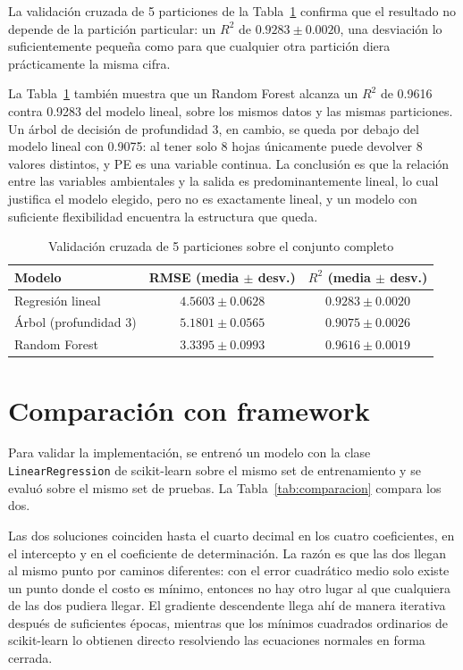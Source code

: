 \documentclass[conference]{IEEEtran}
\begin{document}
La validación cruzada de 5 particiones de la Tabla~\ref{tab:cv} confirma que el resultado no depende de la partición particular: un $R^2$ de $0.9283 \pm 0.0020$, una desviación lo suficientemente pequeña como para que cualquier otra partición diera prácticamente la misma cifra.

La Tabla~\ref{tab:cv} también muestra que un Random Forest alcanza un $R^2$ de 0.9616 contra 0.9283 del modelo lineal, sobre los mismos datos y las mismas particiones. Un árbol de decisión de profundidad 3, en cambio, se queda por debajo del modelo lineal con 0.9075: al tener solo 8 hojas únicamente puede devolver 8 valores distintos, y PE es una variable continua. La conclusión es que la relación entre las variables ambientales y la salida es predominantemente lineal, lo cual justifica el modelo elegido, pero no es exactamente lineal, y un modelo con suficiente flexibilidad encuentra la estructura que queda.

\begin{table}[htbp]
\caption{Validación cruzada de 5 particiones sobre el conjunto completo}
\label{tab:cv}
\centering
\begin{tabular}{lcc}
\toprule
Modelo & RMSE (media $\pm$ desv.) & $R^2$ (media $\pm$ desv.) \\
\midrule
Regresión lineal & $4.5603 \pm 0.0628$ & $0.9283 \pm 0.0020$ \\
Árbol (profundidad 3) & $5.1801 \pm 0.0565$ & $0.9075 \pm 0.0026$ \\
Random Forest & $3.3395 \pm 0.0993$ & $0.9616 \pm 0.0019$ \\
\bottomrule
\end{tabular}
\end{table}

\section{Comparación con framework}
\label{sec:comparacion}
Para validar la implementación, se entrenó un modelo con la clase \texttt{LinearRegression} de scikit-learn sobre el mismo set de entrenamiento y se evaluó sobre el mismo set de pruebas. La Tabla~\ref{tab:comparacion} compara los dos.

Las dos soluciones coinciden hasta el cuarto decimal en los cuatro coeficientes, en el intercepto y en el coeficiente de determinación. La razón es que las dos llegan al mismo punto por caminos diferentes: con el error cuadrático medio solo existe un punto donde el costo es mínimo, entonces no hay otro lugar al que cualquiera de las dos pudiera llegar. El gradiente descendente llega ahí de manera iterativa después de suficientes épocas, mientras que los mínimos cuadrados ordinarios de scikit-learn lo obtienen directo resolviendo las ecuaciones normales en forma cerrada.
\end{document}
